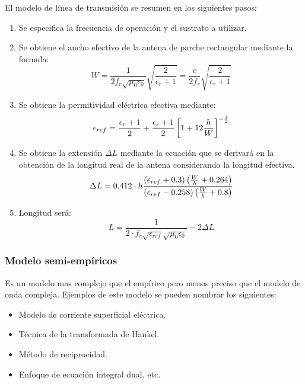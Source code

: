 \documentclass[
	12pt, %
	fleqn, %
	a4paper, %
	oneside, %
]{LegrandOrangeBook}
\begin{document}
El modelo de línea de transmisión se resumen en los siguientes pasos:
\begin{enumerate}
\item Se especifica la frecuencia de operación y el sustrato a utilizar.
\item Se obtiene el ancho efectivo de la antena de parche rectangular mediante la formula:
\begin{displaymath}
W=\frac{1}{2f_r\sqrt{\mu_0\epsilon_0}}\sqrt{\frac{2}{\epsilon_r+1}}=\frac{c}{2f_r}\sqrt{\frac{2}{\epsilon_r+1}}
\end{displaymath}
\item Se obtiene la permitividad eléctrica efectiva mediante:
\begin{displaymath}
\epsilon_{ref}=\frac{\epsilon_r+1}{2}+\frac{\epsilon_r+1}{2}\left[1+12\frac{h}{W}\right]^{-\frac{1}{2}}
\end{displaymath}
\item Se obtiene la extensión $\Delta L$ mediante la ecuación que se derivará en la obtención de la longitud real de la antena considerando la longitud efectiva.
\begin{displaymath}
\Delta L=0.412\cdot h\frac{\left(\epsilon_{ref}+0.3\right)\left(\frac{W}{h}+0.264\right)}{\left(\epsilon_{ref}-0.258\right)\left(\frac{W}{h}+0.8\right)}
\end{displaymath}
\item Longitud será:
\begin{displaymath}
L=\frac{1}{2\cdot f_r\sqrt{\epsilon_{ref}}\sqrt{\mu_0\epsilon_0}}-2\Delta L
\end{displaymath}
\end{enumerate}
\subsubsection{Modelo semi-empíricos}
Es un modelo mas complejo que el empírico pero menos preciso que el modelo de onda compleja. Ejemplos de este modelo se pueden nombrar los siguientes:
\begin{itemize}
\item Modelo de corriente superficial eléctrica.
\item Técnica de la transformada de Hankel.
\item Método de reciprocidad.
\item Enfoque de ecuación integral dual, etc.
\end{itemize}
\end{document}
